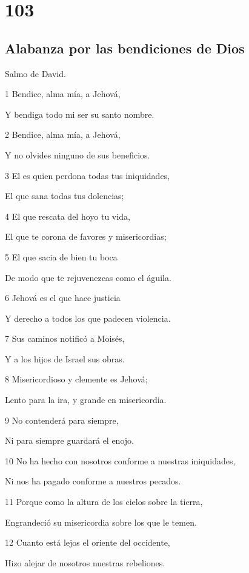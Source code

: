 \chapter{103}

\section*{Alabanza por las bendiciones de Dios}

\par Salmo de David.

\par 1 Bendice, alma mía, a Jehová,
\par Y bendiga todo mi ser su santo nombre.
\par 2 Bendice, alma mía, a Jehová,
\par Y no olvides ninguno de sus beneficios.
\par 3 El es quien perdona todas tus iniquidades,
\par El que sana todas tus dolencias;
\par 4 El que rescata del hoyo tu vida,
\par El que te corona de favores y misericordias;
\par 5 El que sacia de bien tu boca
\par De modo que te rejuvenezcas como el águila.
\par 6 Jehová es el que hace justicia
\par Y derecho a todos los que padecen violencia.
\par 7 Sus caminos notificó a Moisés,
\par Y a los hijos de Israel sus obras.
\par 8 Misericordioso y clemente es Jehová;
\par Lento para la ira, y grande en misericordia.
\par 9 No contenderá para siempre,
\par Ni para siempre guardará el enojo.
\par 10 No ha hecho con nosotros conforme a nuestras iniquidades,
\par Ni nos ha pagado conforme a nuestros pecados.
\par 11 Porque como la altura de los cielos sobre la tierra,
\par Engrandeció su misericordia sobre los que le temen.
\par 12 Cuanto está lejos el oriente del occidente,
\par Hizo alejar de nosotros nuestras rebeliones.
